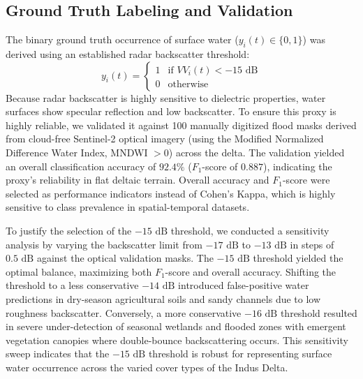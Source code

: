 \subsection{Ground Truth Labeling and Validation}
The binary ground truth occurrence of surface water ($y_i(t) \in \{0, 1\}$) was derived using an established radar backscatter threshold:
\begin{equation}
    y_i(t) = \begin{cases} 1 & \text{if } VV_i(t) < -15\text{ dB} \\ 0 & \text{otherwise} \end{cases}
\end{equation}
Because radar backscatter is highly sensitive to dielectric properties, water surfaces show specular reflection and low backscatter. To ensure this proxy is highly reliable, we validated it against 100 manually digitized flood masks derived from cloud-free Sentinel-2 optical imagery (using the Modified Normalized Difference Water Index, MNDWI $> 0$) across the delta. The validation yielded an overall classification accuracy of $92.4\%$ ($F_1$-score of $0.887$), indicating the proxy's reliability in flat deltaic terrain. Overall accuracy and $F_1$-score were selected as performance indicators instead of Cohen's Kappa, which is highly sensitive to class prevalence in spatial-temporal datasets.

To justify the selection of the $-15\text{ dB}$ threshold, we conducted a sensitivity analysis by varying the backscatter limit from $-17\text{ dB}$ to $-13\text{ dB}$ in steps of $0.5\text{ dB}$ against the optical validation masks. The $-15\text{ dB}$ threshold yielded the optimal balance, maximizing both $F_1$-score and overall accuracy. Shifting the threshold to a less conservative $-14\text{ dB}$ introduced false-positive water predictions in dry-season agricultural soils and sandy channels due to low roughness backscatter. Conversely, a more conservative $-16\text{ dB}$ threshold resulted in severe under-detection of seasonal wetlands and flooded zones with emergent vegetation canopies where double-bounce backscattering occurs. This sensitivity sweep indicates that the $-15\text{ dB}$ threshold is robust for representing surface water occurrence across the varied cover types of the Indus Delta.


